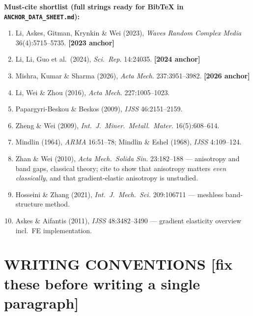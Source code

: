 \documentclass[11pt,a4paper]{article}
\newcommand{\bp}[1]{\textcolor{accent}{\textsf{\footnotesize [#1]}}}
\begin{document}
\medskip
\textbf{Must-cite shortlist (full strings ready for BibTeX in \texttt{ANCHOR\_DATA\_SHEET.md}):}
\begin{enumerate}[label=\arabic*.]
\item Li, Askes, Gitman, Krynkin \& Wei (2023), \emph{Waves Random Complex Media} 36(4):5715--5735. \textbf{[2023 anchor]}
\item Li, Li, Guo et al.\ (2024), \emph{Sci.\ Rep.} 14:24035. \textbf{[2024 anchor]}
\item Mishra, Kumar \& Sharma (2026), \emph{Acta Mech.} 237:3951--3982. \textbf{[2026 anchor]}
\item Li, Wei \& Zhou (2016), \emph{Acta Mech.} 227:1005--1023.
\item Papargyri-Beskou \& Beskos (2009), \emph{IJSS} 46:2151--2159.
\item Zheng \& Wei (2009), \emph{Int.\ J.\ Miner.\ Metall.\ Mater.} 16(5):608--614.
\item Mindlin (1964), \emph{ARMA} 16:51--78; Mindlin \& Eshel (1968), \emph{IJSS} 4:109--124.
\item Zhan \& Wei (2010), \emph{Acta Mech.\ Solida Sin.} 23:182--188 --- anisotropy and band gaps, classical theory; cite to show that anisotropy matters \emph{even classically}, and that gradient-elastic anisotropy is unstudied.
\item Hosseini \& Zhang (2021), \emph{Int.\ J.\ Mech.\ Sci.} 209:106711 --- meshless band-structure method.
\item Askes \& Aifantis (2011), \emph{IJSS} 48:3482--3490 --- gradient elasticity overview incl.\ FE implementation.
\end{enumerate}

\section{WRITING CONVENTIONS \bp{fix these before writing a single paragraph}}
\end{document}
